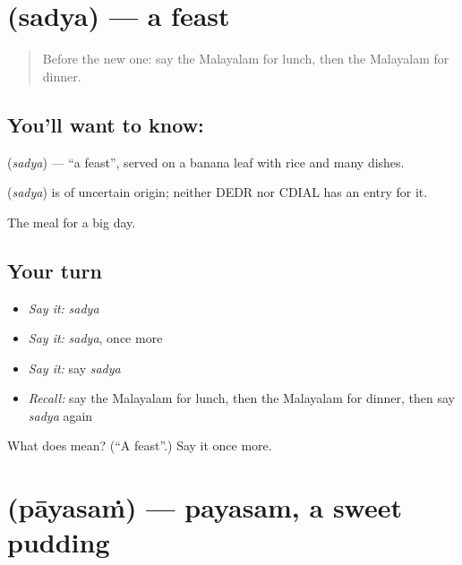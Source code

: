 \section[\texorpdfstring{\ml{സദ്യ} (sadya)}{സദ്യ (sadya)}]{ (sadya) — a feast}

\label{lesson:ML-C130-feast}



\begin{quote}
Before the new one: say the Malayalam for lunch, then the Malayalam for dinner.
\end{quote}

\subsection*{You'll want to know: }
\textbf{} (\emph{sadya}) — \textquotedblleft{}a feast\textquotedblright{}, served on a banana leaf with rice and many dishes.

\begin{cousinweb}
\textbf{} (\emph{sadya}) is of uncertain origin; neither DEDR nor CDIAL has an entry for it.
\end{cousinweb}

\begin{grammarlens}[title={What you've built}]
The meal for a big day.
\end{grammarlens}

\subsection*{Your turn}
\begin{itemize}
\raggedright
  \item \emph{Say it:} \emph{sadya}
  \item \emph{Say it:} \emph{sadya}, once more
  \item \emph{Say it:} say \emph{sadya}
  \item \emph{Recall:} say the Malayalam for lunch, then the Malayalam for dinner, then say \emph{sadya} again
\end{itemize}

\begin{tcolorbox}[breakable,colback=teal!4,colframe=teal!35!black,title={Before you move on}]
What does  mean? (\textquotedblleft{}A feast\textquotedblright{}.) Say it once more.
\end{tcolorbox}
\section[\texorpdfstring{\ml{പായസം} (pāyasaṁ)}{പായസം (pāyasaṁ)}]{ (pāyasaṁ) — payasam, a sweet pudding}

